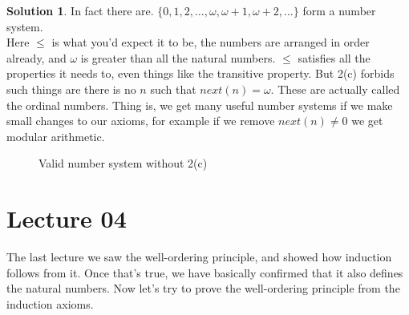 \documentclass[a4paper,10pt]{article}
\theoremstyle{definition} %
\newtheorem*{solution}{Solution}
\begin{document}
    \begin{solution}
        In fact there are.
        $\{0, 1, 2, \dots, \omega, \omega+1, \omega+2, \dots\}$ form a number system. \\
        Here $\leq$ is what you'd expect it to be, the numbers are arranged in order 
        already, and $\omega$ is greater than all the natural numbers. 
        $\leq$ satisfies all the properties it needs to, even things like 
        the transitive property. But 2(c) forbids such things are there is no $n$
        such that $next(n) = \omega$. These are actually called the ordinal numbers.
        Thing is, we get many useful number systems if we make small changes to our axioms,
        for example if we remove $next(n) \neq 0$ we get modular arithmetic.

        \begin{figure}[ht]
            \centering
            \caption{Valid number system without 2(c)}
        \end{figure}        

    \end{solution}

    \section{Lecture 04}

    The last lecture we saw the well-ordering principle, and showed how induction
    follows from it. Once that's true, we have basically confirmed that it also
    defines the natural numbers. Now let's try to prove the well-ordering principle
    from the induction axioms. 
\end{document}
